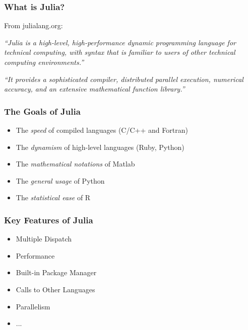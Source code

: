 \documentclass{beamer}
\begin{document}
\begin{frame}
	\frametitle{What is Julia?}
	From julialang.org: \newline

	\textit{``Julia is a high-level, high-performance dynamic programming language for technical computing, with syntax that is familiar to users of other technical computing environments.''}

	\vspace{5mm}\textit{``It provides a sophisticated compiler, distributed parallel execution, numerical accuracy, and an extensive mathematical function library.''}
\end{frame}

\begin{frame}
	\frametitle{The Goals of Julia}
	\begin{itemize}
		\item The \textit{speed} of compiled languages (C/C++ and Fortran) \newline
		\item The \textit{dynamism} of high-level languages (Ruby, Python) \newline
		\item The \textit{mathematical notations} of Matlab \newline
		\item The \textit{general usage} of Python \newline
		\item The \textit{statistical ease} of R
	\end{itemize}
\end{frame}

\begin{frame}
	\frametitle{Key Features of Julia}

	\begin{itemize}
		\item Multiple Dispatch \newline
		\item Performance \newline
		\item Built-in Package Manager \newline
		\item Calls to Other Languages \newline
		\item Parallelism \newline
		\item ...
	\end{itemize}
\end{frame}
\end{document}
